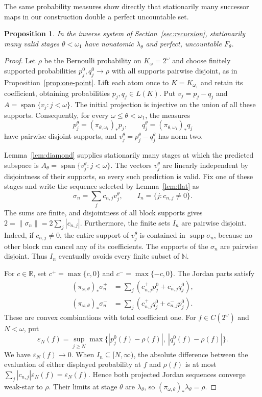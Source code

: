 \documentclass[a4paper,11pt]{amsart}
\theoremstyle{plain}
\newtheorem{proposition}[theorem]{Proposition}
\theoremstyle{definition}
\theoremstyle{remark}
\newcommand{\R}{\mathbb R}
\newcommand{\N}{\mathbb N}
\newcommand{\supp}{\operatorname{supp}}
\newcommand{\Span}{\operatorname{span}}
\newcommand{\eps}{\varepsilon}
\numberwithin{equation}{section}
\begin{document}
The same probability measures show directly that stationarily many successor maps in our construction double a perfect uncountable set.

\begin{proposition}\label{prop:perfect-splitting-stages}
In the inverse system of Section~\ref{sec:recursion}, stationarily many valid stages $\theta<\omega_1$ have nonatomic $\lambda_\theta$ and perfect, uncountable $F_\theta$.
\end{proposition}
\begin{proof}
Let $\rho$ be the Bernoulli probability on $K_\omega=2^\omega$ and choose finitely supported probabilities $p_j^0,q_j^0\to\rho$ with all supports pairwise disjoint, as in Proposition~\ref{prop:one-point}. Lift each atom once to $K=K_{\omega_1}$ and retain its coefficient, obtaining probabilities $p_j,q_j\in L(K)$. Put $v_j=p_j-q_j$ and $A=\Span\{v_j:j<\omega\}$. The initial projection is injective on the union of all these supports. Consequently, for every $\omega\leqslant\theta<\omega_1$, the measures
\[
p_j^\theta=(\pi_{\theta,\omega_1})_*p_j,\qquad
q_j^\theta=(\pi_{\theta,\omega_1})_*q_j
\]
have pairwise disjoint supports, and $v_j^\theta=p_j^\theta-q_j^\theta$ has norm two.

Lemma~\ref{lem:diamond} supplies stationarily many stages at which the predicted subspace is
$A_\theta=\Span\{v_j^\theta:j<\omega\}$. The vectors $v_j^\theta$ are linearly independent by disjointness of their supports, so every such prediction is valid. Fix one of these stages and write the sequence selected by Lemma~\ref{lem:flat} as
\[
\sigma_n=\sum_jc_{n,j}v_j^\theta,\qquad
I_n=\{j:c_{n,j}\neq0\}.
\]
The sums are finite, and disjointness of all block supports gives
$2=\|\sigma_n\|=2\sum_j|c_{n,j}|$.
Furthermore, the finite sets $I_n$ are pairwise disjoint. Indeed, if $c_{n,j}\neq0$, the entire support of $v_j^\theta$ is contained in $\supp\sigma_n$, because no other block can cancel any of its coefficients. The supports of the $\sigma_n$ are pairwise disjoint. Thus $I_n$ eventually avoids every finite subset of $\N$.

For $c\in\R$, set $c^+=\max\{c,0\}$ and $c^-=\max\{-c,0\}$. The Jordan parts satisfy
\[
\begin{split}
(\pi_{\omega,\theta})_*\sigma_n^+
 &=\sum_j(c_{n,j}^+p_j^0+c_{n,j}^-q_j^0),\\
(\pi_{\omega,\theta})_*\sigma_n^-
 &=\sum_j(c_{n,j}^+q_j^0+c_{n,j}^-p_j^0).
\end{split}
\]
These are convex combinations with total coefficient one. For $f\in C(2^\omega)$ and $N<\omega$, put
\[
\eps_N(f)=\sup_{j\geqslant N}
\max\{|p_j^0(f)-\rho(f)|,\ |q_j^0(f)-\rho(f)|\}.
\]
We have $\eps_N(f)\to0$. When $I_n\subseteq[N,\infty)$, the absolute difference between the evaluation of either displayed probability at $f$ and $\rho(f)$ is at most
$\sum_j|c_{n,j}|\eps_N(f)=\eps_N(f)$.
Hence both projected Jordan sequences converge weak-star to $\rho$. Their limits at stage $\theta$ are $\lambda_\theta$, so
$(\pi_{\omega,\theta})_*\lambda_\theta=\rho$.


\end{proof}
\end{document}
